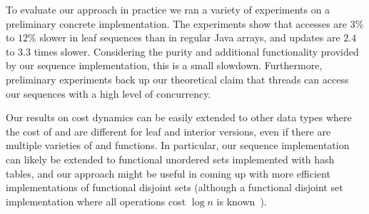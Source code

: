 To evaluate our approach in practice we ran a variety of experiments
on a preliminary concrete implementation.  The
experiments show that accesses are $3\%$ to $12\%$ slower in leaf sequences
than in regular Java arrays, and updates are $2.4$ to $3.3$ times slower.
Considering the purity and additional functionality provided by our sequence
implementation, this is a small slowdown. Furthermore, preliminary experiments 
back up our theoretical claim that threads can access our sequences with a high 
level of concurrency.

Our results on cost dynamics can be easily extended to other data
types where the cost of \get{} and \set{} are different for leaf and
interior versions, even if there are multiple varieties of \get{} and
\set{} functions.   In particular, our sequence implementation can likely
be extended to functional unordered sets implemented with hash tables,
and our approach might be useful in coming up with more efficient
implementations of functional disjoint sets (although a functional
disjoint set implementation where all operations cost $\log{n}$ is
known~\cite{persistentufds}).

